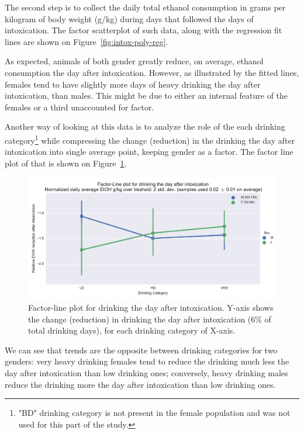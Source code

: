 	The second step is to collect the daily total ethanol consumption in grams per kilogram of body weight (g/kg) during days that followed the days of intoxication. The factor scatterplot of such data, along with the regression fit lines are shown on Figure~\ref{fig:intox-poly-reg}. 
	
	As expected, animals of both gender greatly reduce, on average, ethanol consumption the day after intoxication. However, as illustrated by the fitted lines, females tend to have slightly more days of heavy drinking the day after intoxication, than males. This might be due to either an internal feature of the females or a third unaccounted for factor.    
	
	Another way of looking at this data is to analyze the role of the each drinking category\footnote{"BD" drinking category is not present in the female population and was not used for this part of the study.} while compressing the change (reduction) in the drinking the day after intoxication into single average point, keeping gender as a factor. The factor line plot of that is shown on Figure~\ref{fig:intox-factor-line}. 
	\begin{figure}[ht]
		\centering
		\includegraphics[width=\linewidth]{figures/intox_factor-line_mf.pdf}
		\caption{Factor-line plot for drinking the day after intoxication.  Y-axis shows the change (reduction) in drinking the day after intoxication (6\% of total drinking days), for each drinking category of X-axis.}
		\label{fig:intox-factor-line}
	\end{figure}
	
	We can see that trends are the opposite between drinking categories for two genders: very heavy drinking females tend to reduce the drinking much less the day after intoxication than low drinking ones; conversely, heavy drinking males reduce the drinking more the day after intoxication than low drinking ones.	
	
